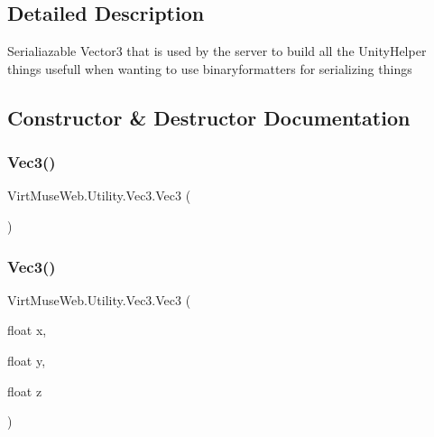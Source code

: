 \subsection{Detailed Description}
Serialiazable Vector3 that is used by the server to build all the Unity\+Helper things usefull when wanting to use binaryformatters for serializing things 



\subsection{Constructor \& Destructor Documentation}
\mbox{\label{class_virt_muse_web_1_1_utility_1_1_vec3_a34b343ad30e74ac4e1d92f79a420b0a0}} 
\subsubsection{\texorpdfstring{Vec3()}{Vec3()}\hspace{0.1cm}{\footnotesize\ttfamily [1/3]}}
{\footnotesize\ttfamily Virt\+Muse\+Web.\+Utility.\+Vec3.\+Vec3 (\begin{DoxyParamCaption}{ }\end{DoxyParamCaption})}

\mbox{\label{class_virt_muse_web_1_1_utility_1_1_vec3_a3cd8f9a64e039ce9ccc8635a3e596cb8}} 
\subsubsection{\texorpdfstring{Vec3()}{Vec3()}\hspace{0.1cm}{\footnotesize\ttfamily [2/3]}}
{\footnotesize\ttfamily Virt\+Muse\+Web.\+Utility.\+Vec3.\+Vec3 (\begin{DoxyParamCaption}\item[{float}]{x,  }\item[{float}]{y,  }\item[{float}]{z }\end{DoxyParamCaption})}

